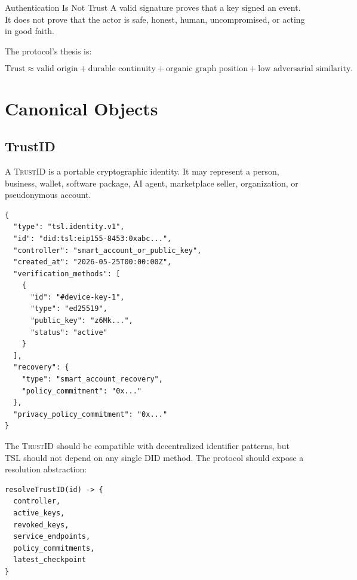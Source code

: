 \documentclass[11pt]{article}
\newcommand{\TSL}{\textsc{TSL}}
\newcommand{\TrustID}{\textsc{TrustID}}
\begin{document}
\begin{warningbox}{Authentication Is Not Trust}
A valid signature proves that a key signed an event. It does not prove that the actor is safe, honest, human, uncompromised, or acting in good faith.
\end{warningbox}

The protocol's thesis is:

\begin{equation}
\text{Trust} \approx \text{valid origin} + \text{durable continuity} + \text{organic graph position} + \text{low adversarial similarity}.
\end{equation}

\section{Canonical Objects}

\subsection{TrustID}

A \TrustID{} is a portable cryptographic identity. It may represent a person, business, wallet, software package, AI agent, marketplace seller, organization, or pseudonymous account.

\begin{lstlisting}[style=tslcode]
{
  "type": "tsl.identity.v1",
  "id": "did:tsl:eip155-8453:0xabc...",
  "controller": "smart_account_or_public_key",
  "created_at": "2026-05-25T00:00:00Z",
  "verification_methods": [
    {
      "id": "#device-key-1",
      "type": "ed25519",
      "public_key": "z6Mk...",
      "status": "active"
    }
  ],
  "recovery": {
    "type": "smart_account_recovery",
    "policy_commitment": "0x..."
  },
  "privacy_policy_commitment": "0x..."
}
\end{lstlisting}

The \TrustID{} should be compatible with decentralized identifier patterns, but \TSL{} should not depend on any single DID method. The protocol should expose a resolution abstraction:

\begin{lstlisting}[style=tslcode]
resolveTrustID(id) -> {
  controller,
  active_keys,
  revoked_keys,
  service_endpoints,
  policy_commitments,
  latest_checkpoint
}
\end{lstlisting}
\end{document}

